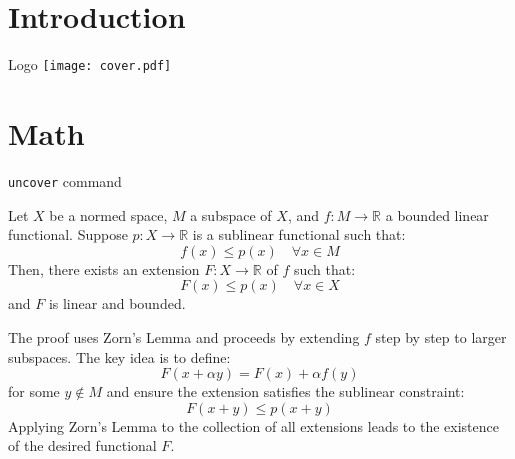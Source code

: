 \documentclass[
    ref = refDemo,
    style = 2
]{spBeamer}
\begin{document}
    \section{Introduction}
        \begin{frame}{Logo}
                \texttt{[image: cover.pdf]}
        \end{frame}

    \section{Math}
        \begin{frame}{\texttt{uncover} command}
        \end{frame}

        \begin{frame}
            \begin{theorem}
                Let \( X \) be a normed space, \( M \) a subspace of \( X \), and \( f: M \to \mathbb{R} \) a bounded linear functional. Suppose \( p: X \to \mathbb{R} \) is a sublinear functional such that:
                \[
                f(x) \leq p(x) \quad \forall x \in M
                \]
                Then, there exists an extension \( F: X \to \mathbb{R} \) of \( f \) such that:
                \[
                F(x) \leq p(x) \quad \forall x \in X
                \]
                and \( F \) is linear and bounded.
            \end{theorem}
            The proof uses Zorn's Lemma and proceeds by extending \( f \) step by step to larger subspaces. The key idea is to define:
            \[
            F(x + \alpha y) = F(x) + \alpha f(y)
            \]
            for some \( y \notin M \) and ensure the extension satisfies the sublinear constraint:
            \[
            F(x + y) \leq p(x + y)
            \]
            Applying Zorn's Lemma to the collection of all extensions leads to the existence of the desired functional \( F \).

        \end{frame}
\end{document}
